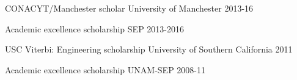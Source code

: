 \begin{cvpress}
\cvpres
{CONACYT/Manchester scholar} %
{University of Manchester} %
{2013-16} %




\cvpres
{Academic excellence scholarship}
{SEP}
{2013-2016}




\cvpres
{USC Viterbi: Engineering scholarship}
{University of Southern California}
{2011}




\cvpres
{Academic excellence scholarship}
{UNAM-SEP}
{2008-11}




\end{cvpress}




